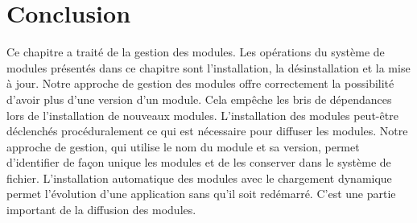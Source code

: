 \section{Conclusion}
%
Ce chapitre a traité de la gestion des modules.  Les opérations du système de
modules présentés dans ce chapitre sont l'installation, la désinstallation et
la mise à jour.  Notre approche de gestion des modules offre correctement la
possibilité d'avoir plus d'une version d'un module. Cela empêche les bris de
dépendances lors de l'installation de nouveaux modules.  L'installation des
modules peut-être déclenchés procéduralement ce qui est nécessaire pour diffuser
les modules. Notre approche de gestion, qui utilise le nom du module et sa
version, permet d'identifier de façon unique les modules et de les conserver
dans le système de fichier. L'installation automatique des modules avec le
chargement dynamique permet l'évolution d'une application sans qu'il soit
redémarré. C'est une partie important de la diffusion des modules.


